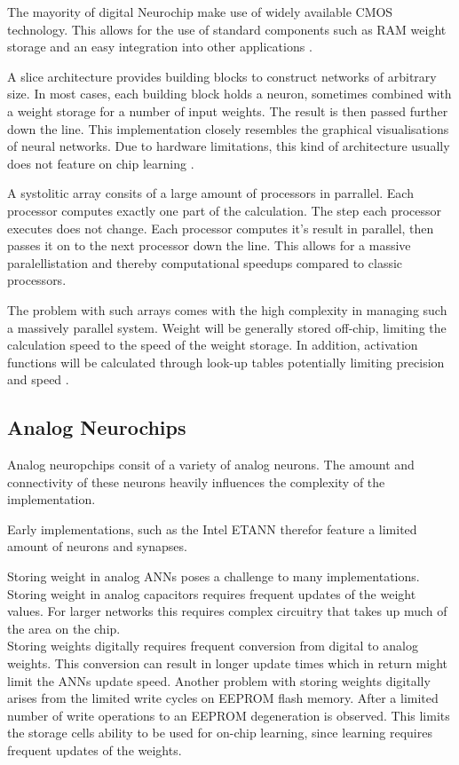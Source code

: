 \documentclass[conference]{IEEEtran}
\begin{document}
    The mayority of digital Neurochip make use of widely available CMOS technology.
    This allows for the use of standard components such as RAM weight storage and an easy integration into other applications \cite{dias2004artificial}.

    A slice architecture provides building blocks to construct networks of arbitrary size.
    In most cases, each building block holds a neuron, sometimes combined with a weight storage for a number of input weights.
    The result is then passed further down the line.
    This implementation closely resembles the graphical visualisations of neural networks.
    Due to hardware limitations, this kind of architecture usually does not feature on chip learning \cite{dias2004artificial}.

    A systolitic array consits of a large amount of processors in parrallel.
    Each processor computes exactly one part of the calculation.
    The step each processor executes does not change.
    Each processor computes it's result in parallel, then passes it on to the next processor down the line.
    This allows for a massive paralellistation and thereby computational speedups compared to classic processors.

    The problem with such arrays comes with the high complexity in managing such a massively parallel system.
    Weight will be generally stored off-chip, limiting the calculation speed to the speed of the weight storage.
    In addition, activation functions will be calculated through look-up tables potentially limiting precision and speed \cite{dias2004artificial}.



    \subsection{Analog Neurochips}

    Analog neuropchips consit of a variety of analog neurons.
    The amount and connectivity of these neurons heavily influences the complexity of the implementation.

    Early implementations, such as the Intel ETANN therefor feature a limited amount of neurons and synapses.

    Storing weight in analog ANNs poses a challenge to many implementations.
    Storing weight in analog capacitors requires frequent updates of the weight values.
    For larger networks this requires complex circuitry that takes up much of the area on the chip.
    \\
    Storing weights digitally requires frequent conversion from digital to analog weights.
    This conversion can result in longer update times which in return might limit the ANNs update speed.
    Another problem with storing weights digitally arises from the limited write cycles on EEPROM flash memory.
    After a limited number of write operations to an EEPROM degeneration is observed.
    This limits the storage cells ability to be used for on-chip learning, since learning requires frequent updates of the weights.
\end{document}
